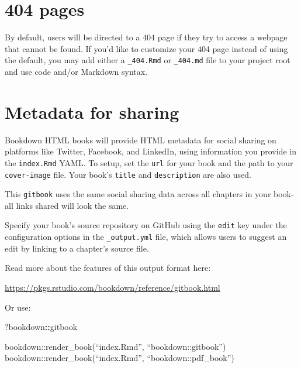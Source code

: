 \documentclass[
]{book}
\newenvironment{Shaded}{\begin{snugshade}}{\end{snugshade}}
\newcommand{\NormalTok}[1]{#1}
\newcommand{\SpecialCharTok}[1]{\textcolor[rgb]{0.81,0.36,0.00}{\textbf{#1}}}
\theoremstyle{definition}
\theoremstyle{definition}
\theoremstyle{definition}
\theoremstyle{definition}
\theoremstyle{remark}
\begin{document}
\hypertarget{pages}{%
\section{404 pages}\label{pages}}

By default, users will be directed to a 404 page if they try to access a webpage that cannot be found. If you'd like to customize your 404 page instead of using the default, you may add either a \texttt{\_404.Rmd} or \texttt{\_404.md} file to your project root and use code and/or Markdown syntax.

\hypertarget{metadata-for-sharing}{%
\section{Metadata for sharing}\label{metadata-for-sharing}}

Bookdown HTML books will provide HTML metadata for social sharing on platforms like Twitter, Facebook, and LinkedIn, using information you provide in the \texttt{index.Rmd} YAML. To setup, set the \texttt{url} for your book and the path to your \texttt{cover-image} file. Your book's \texttt{title} and \texttt{description} are also used.

This \texttt{gitbook} uses the same social sharing data across all chapters in your book- all links shared will look the same.

Specify your book's source repository on GitHub using the \texttt{edit} key under the configuration options in the \texttt{\_output.yml} file, which allows users to suggest an edit by linking to a chapter's source file.

Read more about the features of this output format here:

\url{https://pkgs.rstudio.com/bookdown/reference/gitbook.html}

Or use:

\begin{Shaded}
\begin{Highlighting}[]
\NormalTok{?bookdown}\SpecialCharTok{::}\NormalTok{gitbook}
\end{Highlighting}
\end{Shaded}

bookdown::render\_book(``index.Rmd'', ``bookdown::gitbook'')
bookdown::render\_book(``index.Rmd'', ``bookdown::pdf\_book'')

  
\end{document}
